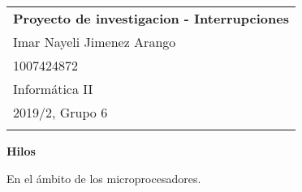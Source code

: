 \documentclass[a4paper,12pt]{article}
\begin{document}
\thispagestyle{empty}  

\begin{tabular}{p{15.5cm}}  
{\large \bf Proyecto de investigacion - Interrupciones} \\ Imar Nayeli Jimenez Arango \\ 1007424872\\ Informática II   \\ 2019/2, Grupo 6\\
\hline %
\\
\end{tabular} %

\vspace*{0.3cm} %

\begin{center} %
	{\Large \bf Hilos} %
	\vspace{2mm}
	
		
\end{center}  

\vspace{0.4cm}



En el ámbito de los microprocesadores. 
\end{document}
